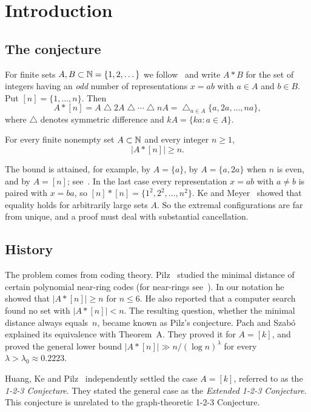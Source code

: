 \section{Introduction}\label{sec:intro}

\subsection{The conjecture}
For finite sets $A,B\subset\mathbb{N}=\{1,2,\dots\}$ we follow~\cite{HP} and write $A*B$ for the set of integers having an \emph{odd} number of representations $x=ab$ with $a\in A$ and $b\in B$. Put $[n]=\{1,\dots,n\}$. Then
\[
 A*[n]=A\mathbin{\triangle}2A\mathbin{\triangle}\cdots\mathbin{\triangle}nA
      =\mathop{\triangle}_{a\in A}\{a,2a,\dots,na\},
\]
where $\triangle$ denotes symmetric difference and $kA=\{ka:a\in A\}$.

\begin{maintheorem}
For every finite nonempty set $A\subset\mathbb{N}$ and every integer $n\ge1$,
\[
                        |A*[n]|\ge n .
\]
\end{maintheorem}

The bound is attained, for example, by $A=\{a\}$, by $A=\{a,2a\}$ when $n$ is even, and by $A=[n]$; see~\cite[Section~1]{HP}. In the last case every representation $x=ab$ with $a\ne b$ is paired with $x=ba$, so $[n]*[n]=\{1^2,2^2,\dots,n^2\}$. Ke and Meyer~\cite{KM} showed that equality holds for arbitrarily large sets $A$. So the extremal configurations are far from unique, and a proof must deal with substantial cancellation.

\subsection{History}
The problem comes from coding theory. Pilz~\cite{Pilz} studied the minimal distance of certain polynomial near-ring codes (for near-rings see~\cite{PilzBook}). In our notation he showed that $|A*[n]|\ge n$ for $n\le6$. He also reported that a computer search found no set with $|A*[n]|<n$. The resulting question, whether the minimal distance always equals~$n$, became known as Pilz's conjecture. Pach and Szab\'o~\cite{PS} explained its equivalence with Theorem~A. They proved it for $A=[k]$, and proved the general lower bound $|A*[n]|\gg n/(\log n)^{\lambda}$ for every $\lambda>\lambda_0\approx 0.2223$.

Huang, Ke and Pilz~\cite{HKP} independently settled the case $A=[k]$, referred to as the \emph{1-2-3 Conjecture}. They stated the general case as the \emph{Extended 1-2-3 Conjecture}. This conjecture is unrelated to the graph-theoretic 1-2-3 Conjecture.

